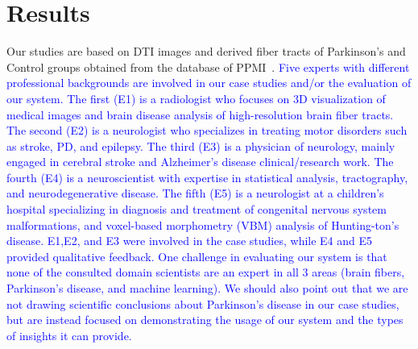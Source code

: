 
\section{Results}
\label{sec:cases}

\noindent %
Our studies are based on DTI images and %
derived fiber tracts of Parkinson's and Control groups obtained from the 
database of PPMI~\cite{marek2011parkinson}. \textcolor{blue}{Five experts with different professional backgrounds are involved in our case studies and/or the evaluation of our system. The first (E1) is a radiologist who focuses on 3D visualization of medical images and brain disease analysis of high-resolution brain fiber tracts. The second (E2) is a neurologist who specializes in treating motor disorders such as stroke, PD, and epilepsy. The third (E3) is a physician of neurology, mainly engaged in cerebral stroke and Alzheimer's disease clinical/research work. The fourth (E4) is a neuroscientist with expertise in statistical analysis, tractography, and neurodegenerative disease. The fifth (E5) is a neurologist at a children’s hospital specializing in diagnosis and treatment of congenital nervous system malformations, and voxel-based morphometry (VBM) analysis of Hunting-ton’s disease. E1,E2, and E3 were involved in the case studies, while E4 and E5 provided qualitative feedback. One challenge in evaluating our system is that none of the consulted domain scientists are an expert in all 3 areas (brain fibers, Parkinson's disease, and machine learning). We should also point out that we are not drawing scientific conclusions about Parkinson's disease in our case studies, but are instead focused on demonstrating the usage of our system and the types of insights it can provide.}




